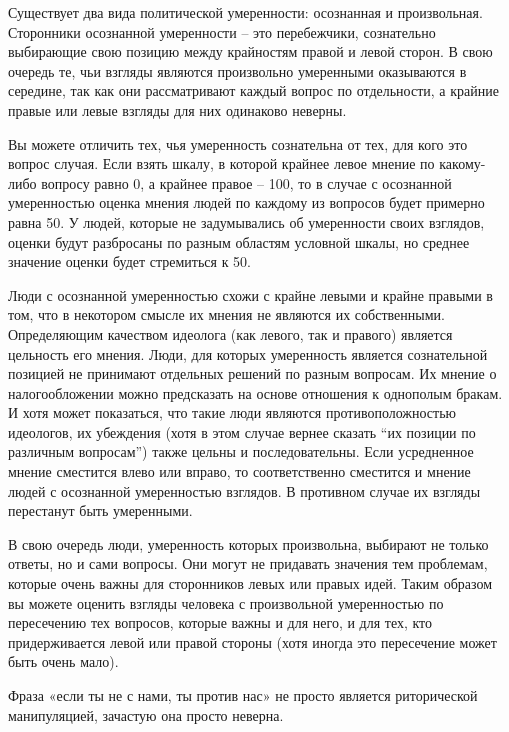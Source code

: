 \documentclass[ebook,12pt,oneside,openany]{memoir}
\begin{document}
\maketitle

Существует два вида политической умеренности: осознанная и
произвольная. Сторонники осознанной умеренности – это перебежчики,
сознательно выбирающие свою позицию между крайностям правой и левой
сторон. В свою очередь те, чьи взгляды являются произвольно умеренными
оказываются в середине, так как они рассматривают каждый вопрос по
отдельности, а крайние правые или левые взгляды для них одинаково
неверны.

Вы можете отличить тех, чья умеренность сознательна от тех, для кого
это вопрос случая. Если взять шкалу, в которой крайнее левое мнение по
какому-либо вопросу равно 0, а крайнее правое – 100, то в случае с
осознанной умеренностью оценка мнения людей по каждому из вопросов
будет примерно равна 50. У людей, которые не задумывались об
умеренности своих взглядов, оценки будут разбросаны по разным областям
условной шкалы, но среднее значение оценки будет стремиться к 50.

Люди с осознанной умеренностью схожи с крайне левыми и крайне правыми
в том, что в некотором смысле их мнения не являются их собственными.
Определяющим качеством идеолога (как левого, так и правого) является
цельность его мнения. Люди, для которых умеренность является
сознательной позицией не принимают отдельных решений по разным
вопросам. Их мнение о налогообложении можно предсказать на основе
отношения к однополым бракам. И хотя может показаться, что такие люди
являются противоположностью идеологов, их убеждения (хотя в этом
случае вернее сказать “их позиции по различным вопросам”) также цельны
и последовательны. Если усредненное мнение сместится влево или вправо,
то соответственно сместится и мнение людей с осознанной умеренностью
взглядов. В противном случае их взгляды перестанут быть умеренными.

В свою очередь люди, умеренность которых произвольна, выбирают не
только ответы, но и сами вопросы. Они могут не придавать значения тем
проблемам, которые очень важны для сторонников левых или правых идей.
Таким образом вы можете оценить взгляды человека с произвольной
умеренностью по пересечению тех вопросов, которые важны и для него, и
для тех, кто придерживается левой или правой стороны (хотя иногда это
пересечение может быть очень мало).

Фраза «если ты не с нами, ты против нас» не просто является
риторической манипуляцией, зачастую она просто неверна.
\end{document}
